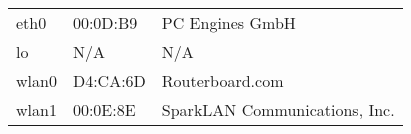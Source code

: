 \begin{tabular}{lll}
eth0 & 00:0D:B9 & PC Engines GmbH \\
lo & N/A & N/A \\
wlan0 & D4:CA:6D & Routerboard.com \\
wlan1 & 00:0E:8E & SparkLAN Communications, Inc. \\
\end{tabular}
